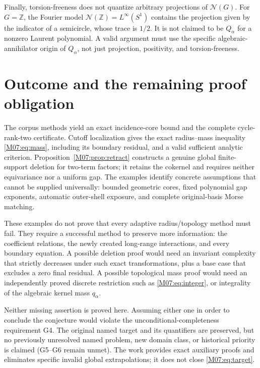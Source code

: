 \documentclass[11pt,a4paper,oneside]{report}
\theoremstyle{definition}
\theoremstyle{remark}
\newcommand{\Z}{\mathbb Z}
\begin{document}
Finally, torsion-freeness does not quantize arbitrary
projections of $\mathcal N(G)$. For $G=\Z$, the Fourier
model $\mathcal N(\Z)=L^\infty(S^1)$ contains the projection
given by the indicator of a semicircle, whose trace is
$1/2$. It is not claimed to be $Q_\alpha$ for a nonzero
Laurent polynomial. A valid argument must use the
specific algebraic-annihilator origin of $Q_\alpha$,
not just projection, positivity, and torsion-freeness.

\section{Outcome and the remaining proof obligation}

The corpus methods yield an exact incidence-core bound
and the complete cycle-rank-two certificate. Cutoff
localization gives the exact radius--mass inequality
\eqref{M07:eq:mass}, including its boundary residual, and
a valid sufficient analytic criterion. Proposition~\ref{M07:prop:retract}
constructs a genuine global finite-support deletion for
two-term factors; it retains the cokernel and requires
neither equivariance nor a uniform gap. The examples
identify concrete assumptions that cannot be supplied
universally: bounded geometric cores, fixed polynomial
gap exponents, automatic outer-shell exposure, and
complete original-basis Morse matching.

These examples do not prove that every adaptive
radius/topology method must fail. They require a
successful method to preserve more information:
the coefficient relations, the newly created
long-range interactions, and every boundary equation.
A possible deletion proof would need an invariant
complexity that strictly decreases under such exact
transformations, plus a base case that excludes a
zero final residual. A possible topological mass
proof would need an independently proved discrete
restriction such as \eqref{M07:eq:integer}, or integrality
of the algebraic kernel mass $q_\alpha$.

Neither missing assertion is proved here. Assuming
either one in order to conclude the conjecture would
violate the unconditional-completeness requirement G4.
The original named target and its quantifiers are
preserved, but no previously unresolved named problem,
new domain class, or historical priority is claimed
(G5--G6 remain unmet). The work provides exact
auxiliary proofs and eliminates specific invalid
global extrapolations; it does not close
\eqref{M07:eq:target}.

\begingroup\raggedright
\end{document}
